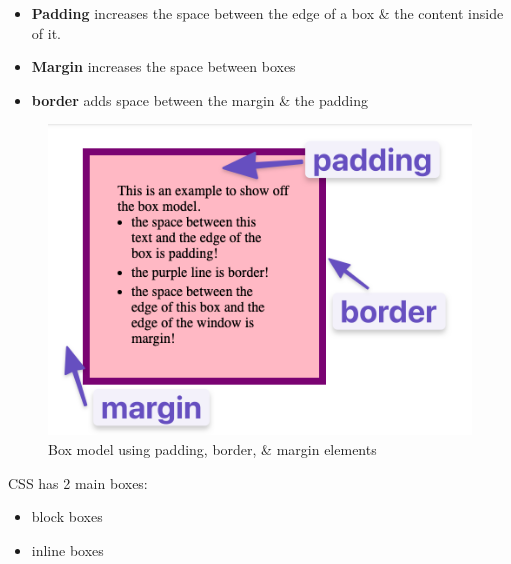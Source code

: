 \documentclass{article}
\begin{document}
	\begin{itemize}
		\item {\bf Padding} increases the space between the edge of a box \& the content inside of it.
		\item {\bf Margin} increases the space between boxes
		\item {\bf border} adds space between the margin \& the padding
	\end{itemize}

	\begin{figure}[H]
		\includegraphics[width=\linewidth]{OdinProjectPics/box-model.png}
		\caption{Box model using padding, border, \& margin elements}
		\label{Box model}
	\end{figure}

	CSS has 2 main boxes:
	\begin{itemize}
		\item block boxes
		\item inline boxes
	\end{itemize}
\end{document}
